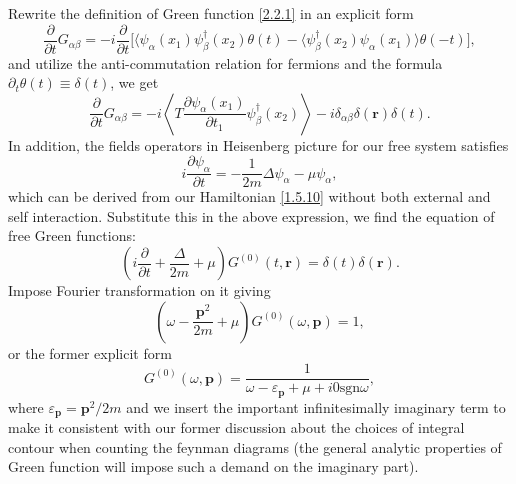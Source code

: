 \documentclass[b5paper,10pt,UTF8]{book}
\numberwithin{equation}{section}
\begin{document}
			\begin{Proof}
				Rewrite the definition of Green function \eqref{2.2.1} in an explicit form
				\begin{equation*}
					\dfrac{\partial}{\partial t}G_{\alpha\beta}=-i\dfrac{\partial}{\partial t}\bigg[\langle\psi_\alpha(x_1)\psi_\beta^\dagger(x_2)\theta(t)-\langle\psi_\beta^\dagger(x_2)\psi_\alpha(x_1)\rangle\theta(-t)\bigg],
				\end{equation*}
				and utilize the anti-commutation relation for fermions and the formula $\partial_t\theta(t)\equiv\delta(t)$, we get
				$$\dfrac{\partial}{\partial t}G_{\alpha\beta}=-i\left\langle T\dfrac{\partial\psi_\alpha(x_1)}{\partial t_1}\psi_\beta^\dagger(x_2)\right\rangle-i\delta_{\alpha\beta}\delta(\bm{r})\delta(t).$$
				In addition, the fields operators in Heisenberg picture for our free system satisfies
				\begin{equation}\label{2.3.8}
					i\dfrac{\partial\psi_\alpha}{\partial t}=-\dfrac{1}{2m}\Delta\psi_\alpha-\mu\psi_\alpha,
				\end{equation}
				which can be derived from our Hamiltonian \eqref{1.5.10} without both external and self interaction. Substitute this in the above expression, we find the equation of free Green functions:
				\begin{equation*}
					\left(i\dfrac{\partial }{\partial t}+\dfrac{\Delta}{2m}+\mu\right)G^{(0)}(t,\bm{r})=\delta(t)\delta(\bm{r}).
				\end{equation*}
				Impose Fourier transformation on it giving
				\begin{equation}\label{2.3.9}
					\left(\omega-\dfrac{\bm{p}^2}{2m}+\mu\right)G^{(0)}(\omega,\bm{p})=1,
				\end{equation}
				or the former explicit form
				\begin{equation*}
					G^{(0)}(\omega,\bm{p})=\dfrac{1}{\omega-\varepsilon_{\bm p}+\mu+i0\mathrm{sgn}\omega},
				\end{equation*}
				where $\varepsilon_{\bm p}=\bm{p}^2/2m$ and we insert the important infinitesimally imaginary term to make it consistent with our former discussion about the choices of integral contour when counting the feynman diagrams (the general analytic properties of Green function will impose such a demand on the imaginary part).
			\end{Proof}
\end{document}
